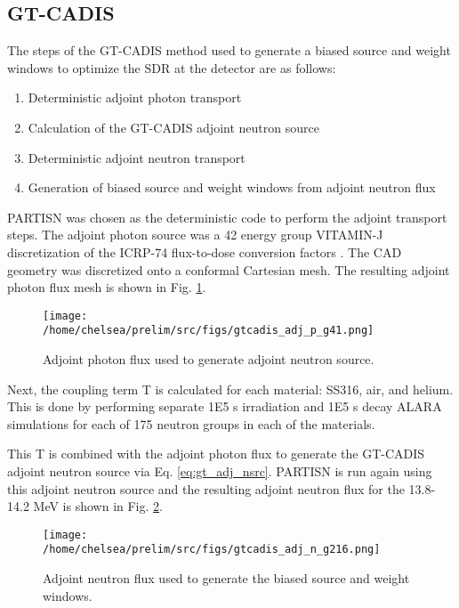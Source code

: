 \subsection{GT-CADIS}\label{sec:gtcadis}
The steps of the GT-CADIS method used to generate a biased source and weight windows to optimize
the SDR at the detector are as follows:
\begin{enumerate}
	\item Deterministic adjoint photon transport
	\item Calculation of the GT-CADIS adjoint neutron source
	\item Deterministic adjoint neutron transport
	\item Generation of biased source and weight windows from adjoint neutron flux
\end{enumerate}

PARTISN \cite{partisn} was chosen as the deterministic code to perform the adjoint transport
steps.  The adjoint photon source was a 42 energy group VITAMIN-J discretization of the
ICRP-74 flux-to-dose conversion factors \cite{f2d}.  The CAD geometry was discretized onto
a conformal Cartesian mesh.  The resulting adjoint photon flux mesh is shown in
Fig. \ref{fig:adj_p_flux}.

\begin{figure}\label{fig:adj_p_flux}
	\texttt{[image: /home/chelsea/prelim/src/figs/gtcadis\_adj\_p\_g41.png]}
	\caption [GT-CADIS adjoint photon flux] 
	{Adjoint photon flux used to generate adjoint neutron source.}
\end{figure}


Next, the coupling term T is calculated for each material: SS316, air, and
helium.  This is done by performing separate 1E5 s irradiation and 1E5 s decay ALARA
simulations for each of 175 neutron groups in each of the materials.

This T is combined with the adjoint photon flux to generate the GT-CADIS
adjoint neutron source via Eq. \ref{eq:gt_adj_nsrc}. 
PARTISN is run again using this adjoint neutron source and the resulting
adjoint neutron flux for the 13.8-14.2 MeV is shown in Fig.
\ref{fig:adj_n_flux}.

\begin{figure}\label{fig:adj_n_flux}
	\texttt{[image: /home/chelsea/prelim/src/figs/gtcadis\_adj\_n\_g216.png]}
	\caption [GT-CADIS adjoint neutron flux] 
	{Adjoint neutron flux used to generate the biased source and weight
	windows. }
\end{figure}


